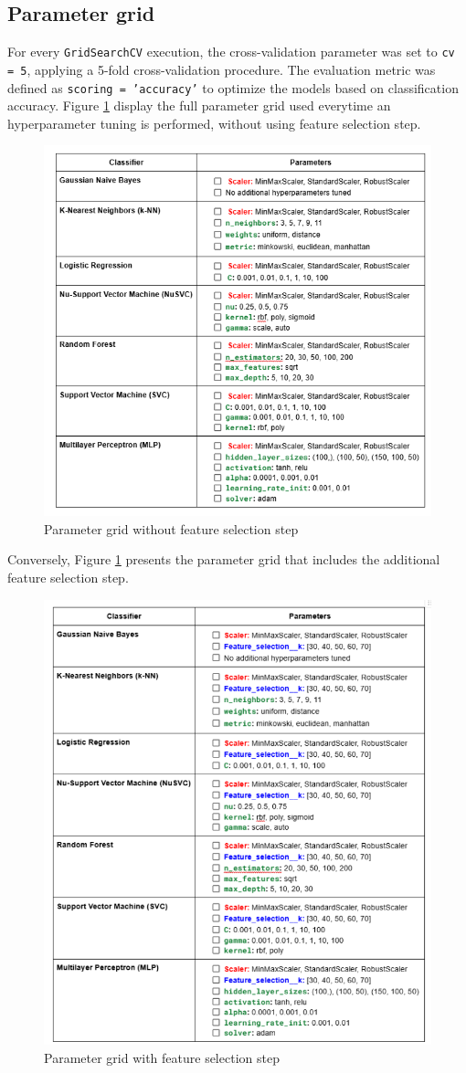 \documentclass{article}
\begin{document}
\subsection{Parameter grid}

For every \texttt{GridSearchCV} execution, the cross-validation parameter was set to \texttt{cv = 5}, applying a 5-fold cross-validation procedure.
The evaluation metric was defined as \texttt{scoring = 'accuracy'} to optimize the models based on classification accuracy.
Figure \ref{fig:pg_nofs} display the full parameter grid used everytime an hyperparameter tuning is performed, without using feature selection step.

\begin{figure}[ht]
    \centering
    \includegraphics[width = 0.4
    \textwidth]{Images/Results/param_grid_nofs.png}
    \caption{Parameter grid without feature selection step}
    \label{fig:pg_nofs}
\end{figure}

Conversely, Figure \ref{fig:pg_nofs} presents the parameter grid that includes the additional feature selection step.

\begin{figure}[ht]
    \centering
    \includegraphics[width = 0.4
    \textwidth]{Images/Results/fs.png}
    \caption{Parameter grid with feature selection step}
    \label{fig:pg_fs}
\end{figure}
\end{document}
